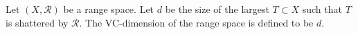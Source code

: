 \begin{definition}[VC-dimension]
	Let \((X, \mathcal{R})\) be a range space.
	Let \(d\) be the size of the largest \(T \subset X\) such that
	\(T\) is shattered by \(\mathcal{R}\).
	The VC-dimension of the range space is defined to be \(d\).
\end{definition}

